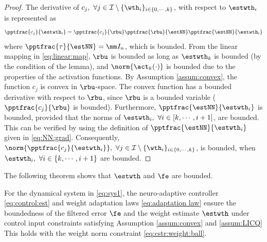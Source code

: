 \documentclass[lettersize,journal]{IEEEtran}
\begin{document}
\begin{proof}

The derivative of $c_j,\ \forall j\in\mathcal I \setminus \{\wth_i\}_{i\in\{0,\cdots,k\}}$, with respect to $\estwth_i$ is represented as
\begin{equation}
    \pptfrac{c_j}{\estwth_i} 
    = 
    \pptfrac{c_j}{\rbu} 
    \pptfrac{\rbu}{\estNN} 
    \pptfrac{\estNN}{\estwth_i}
\end{equation}
where $\pptfrac{\tau}{\estNN}=\mm I_n$, which is bounded. 
From the linear mapping in \eqref{eq:linear:map}, $\rbu$ is bounded as long as $\estwth_k$ is bounded (by the condition of the lemma), and $\norm{\act_k(\cdot)}$ is bounded due to the properties of the activation functions. 
By Assumption \ref{assum:convex}, the function $c_j$ is convex in $\rbu$-space.
The convex function has a bounded derivative with respect to $\rbu$, since $\rbu$ is a bounded variable (\ie $\pptfrac{c_j}{\rbu}$ is bounded). 
Furthermore, $\pptfrac{\estNN}{\estwth_i}$ is bounded, provided that the norms of $\estwth_i,\ \forall i \in[k,\cdots,i+1]$, are bounded. 
This can be verified by using the definition of $\pptfrac{\estNN}{\estwth_i}$ given in \eqref{eq:NN:grad}.
Consequently, $\norm{\pptfrac{c_j}{\estwth_i}},\ \forall j\in\mathcal I \setminus \{\wth_i\}_{i\in\{0,\cdots,k\}}$, is bounded, when $\estwth_i,\ \forall i\in \{k,\cdots,i+1\}$ are bounded.

\end{proof}

The following theorem shows that $\estwth$ and $\fe$ are bounded.

\begin{theorem}
    For the dynamical system in \eqref{eq:sys1}, the neuro-adaptive controller \eqref{eq:control:est} and weight adaptation laws \eqref{eq:adaptation law} ensure the boundedness of the filtered error $\fe$ and the weight estimate $\estwth$ under control input constraints satisfying Assumption \ref{assum:convex} and \ref{assum:LICQ}
    This holds with the weight norm constraint \eqref{eq:cstr:weight:ball}.
\end{theorem}
\end{document}
